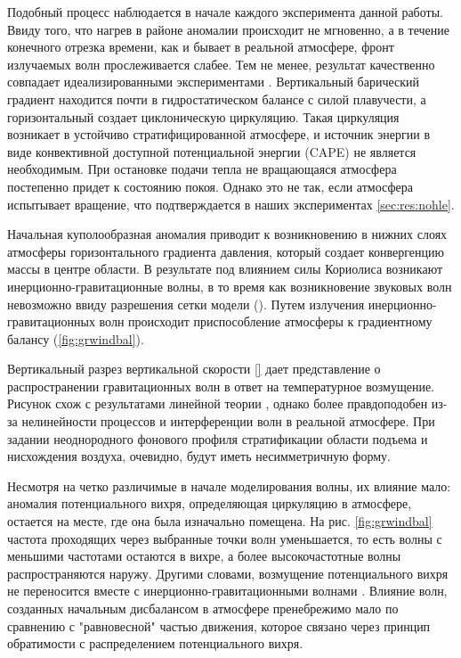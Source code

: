 \documentclass[12pt,a4paper]{report}
\begin{document}
Подобный процесс наблюдается в начале каждого эксперимента данной работы. Ввиду того, что нагрев в районе аномалии происходит не мгновенно, а в течение конечного отрезка времени, как и бывает в реальной атмосфере,  фронт излучаемых волн прослеживается слабее. Тем не менее, результат качественно совпадает идеализированными экспериментами \citep{RT2003}. Вертикальный барический градиент находится почти в гидростатическом балансе с силой плавучести, а горизонтальный создает циклоническую циркуляцию. Такая циркуляция возникает в устойчиво стратифицированной атмосфере, и источник энергии в виде конвективной доступной потенциальной энергии (CAPE) не является необходимым. При остановке подачи тепла не вращающаяся атмосфера постепенно придет к состоянию покоя. Однако это не так, если атмосфера испытывает вращение, что подтверждается в наших экспериментах \ref{sec:res:nohle}.

Начальная куполообразная аномалия приводит к возникновению в нижних слоях атмосферы горизонтального градиента давления, который создает конвергенцию массы в центре области. В результате под влиянием силы Кориолиса возникают инерционно-гравитационные волны, в то время как возникновение звуковых волн невозможно ввиду разрешения сетки модели (\citep{MillerWhite1984,MirandaPhD}). Путем излучения инерционно-гравитационных волн происходит приспособление атмосферы к градиентному балансу (\ref{fig:grwindbal}).

Вертикальный разрез вертикальной скорости \ref{} дает представление о распространении гравитационных волн в ответ на температурное возмущение. Рисунок схож с результатами линейной теории \citep{Lin2007}, однако более правдоподобен из-за нелинейности процессов и интерференции волн в реальной атмосфере. При задании неоднородного фонового профиля стратификации области подъема и нисхождения воздуха, очевидно, будут иметь несимметричную форму.

Несмотря на четко различимые в начале моделирования волны, их влияние мало: аномалия потенциального вихря, определяющая циркуляцию в атмосфере, остается на месте, где она была изначально помещена. На рис. \ref{fig:grwindbal} частота проходящих через выбранные точки волн уменьшается, то есть волны с меньшими частотами остаются в вихре, а более высокочастотные волны распространяются наружу. Другими словами, возмущение потенциального вихря не переносится вместе с инерционно-гравитационными волнами \citep{RT2003}. Влияние волн, созданных начальным дисбалансом в атмосфере пренебрежимо мало по сравнению с "равновесной" частью движения, которое связано через принцип обратимости с распределением потенциального вихря.
\end{document}
